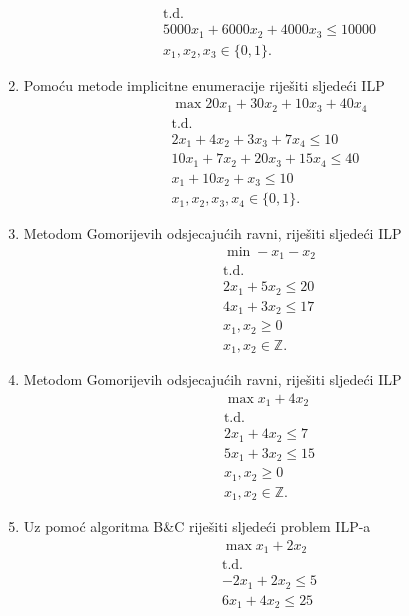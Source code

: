 \documentclass[a4paper, utf8, 11pt, colorlinks]{book}
\theoremstyle{definition}
\begin{document}
\begin{enumerate}
\begin{align*}
  &\mbox{t.d.} \\
  & 5000 x_1 + 6000 x_2 + 4000 x_3 \leq 10000 \\
  & x_1, x_2, x_3 \in \{0, 1\}.
\end{align*}
\item  Pomoću metode implicitne enumeracije riješiti sljedeći ILP
\begin{align*}
	 &\max 20 x_1 + 30 x_2 + 10 x_3 + 40 x_4 \\
	 &\mbox{t.d.}\\
	 & 2x_1 + 4 x_2 + 3 x_3 + 7 x_4 \leq 10 \\
	 & 10 x_1 + 7 x_2 + 20 x_3 + 15 x_4 \leq 40 \\
	 & x_1 + 10 x_2 + x_3 \leq 10 \\
	 & x_1, x_2, x_3, x_4 \in \{0, 1\}.
\end{align*}
	\item Metodom Gomorijevih odsjecajućih ravni, riješiti sljedeći ILP%
	\begin{align*}
		 &\min -x_1 - x_2 \\
		 &\mbox{t.d.}\\
		 & 2 x_1 + 5x_2 \leq 20 \\
		 & 4 x_1 + 3 x_2 \leq 17 \\
		 & x_1, x_2 \geq 0 \\
		 & x_1, x_2 \in \mathbb{Z}.
	\end{align*}
\item Metodom Gomorijevih odsjecajućih ravni, riješiti sljedeći ILP%
\begin{align*}
	& \max x_1 + 4 x_2 \\
	& \mbox{t.d.} \\
	& 2 x_1 + 4 x_2 \leq 7 \\
	& 5 x_1 + 3 x_2 \leq 15 \\
	& x_1, x_2 \geq 0 \\
	& x_1, x_2 \in \mathbb{Z}.
	\end{align*}
\item    %
  Uz pomoć algoritma B\&C riješiti sljedeći problem ILP-a
  \begin{align*}
  	 &\max x_1 + 2 x_2 \\
  	 &\mbox{t.d.} \\
  	 & -2x_1 + 2 x_2 \leq 5 \\
  	 & 6 x_1 + 4 x_2 \leq 25 \\

\end{align*}
\end{enumerate}
\end{document}
